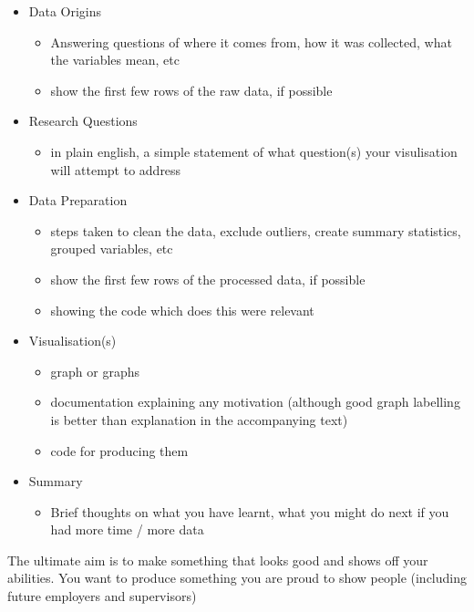 \documentclass[
]{book}
\providecommand{\tightlist}{%
  \setlength{\itemsep}{0pt}\setlength{\parskip}{0pt}}
\begin{document}
\begin{itemize}
\tightlist
\item
  Data Origins

  \begin{itemize}
  \tightlist
  \item
    Answering questions of where it comes from, how it was collected, what the variables mean, etc
  \item
    show the first few rows of the raw data, if possible
  \end{itemize}
\item
  Research Questions

  \begin{itemize}
  \tightlist
  \item
    in plain english, a simple statement of what question(s) your visulisation will attempt to address
  \end{itemize}
\item
  Data Preparation

  \begin{itemize}
  \tightlist
  \item
    steps taken to clean the data, exclude outliers, create summary statistics, grouped variables, etc
  \item
    show the first few rows of the processed data, if possible
  \item
    showing the code which does this were relevant
  \end{itemize}
\item
  Visualisation(s)

  \begin{itemize}
  \tightlist
  \item
    graph or graphs
  \item
    documentation explaining any motivation (although good graph labelling is better than explanation in the accompanying text)
  \item
    code for producing them
  \end{itemize}
\item
  Summary

  \begin{itemize}
  \tightlist
  \item
    Brief thoughts on what you have learnt, what you might do next if you had more time / more data
  \end{itemize}
\end{itemize}

The ultimate aim is to make something that looks good and shows off your abilities. You want to produce something you are proud to show people (including future employers and supervisors)
\end{document}
